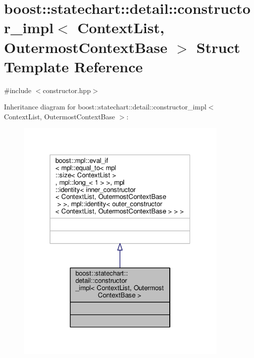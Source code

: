\hypertarget{structboost_1_1statechart_1_1detail_1_1constructor__impl}{}\section{boost\+:\+:statechart\+:\+:detail\+:\+:constructor\+\_\+impl$<$ Context\+List, Outermost\+Context\+Base $>$ Struct Template Reference}
\label{structboost_1_1statechart_1_1detail_1_1constructor__impl}


{\ttfamily \#include $<$constructor.\+hpp$>$}



Inheritance diagram for boost\+:\+:statechart\+:\+:detail\+:\+:constructor\+\_\+impl$<$ Context\+List, Outermost\+Context\+Base $>$\+:
\nopagebreak
\begin{figure}[H]
\begin{center}
\leavevmode
\includegraphics[width=292pt]{structboost_1_1statechart_1_1detail_1_1constructor__impl__inherit__graph}
\end{center}
\end{figure}


